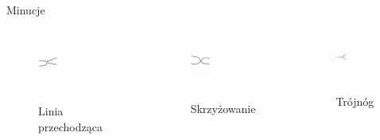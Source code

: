 \documentclass{beamer}
\begin{document}
\begin{frame}{Minucje}
    \begin{columns}
            \begin{figure}[t]
    			\centering
                \includegraphics[width=0.3\textwidth]{fingerprints/minucje/linia_przech.jpg}\\~\
                \caption*{Linia przechodząca}
            \end{figure}
		    \begin{figure}[t]
        		\centering
                \includegraphics[width=0.3\textwidth]{fingerprints/minucje/skrzyzowanie.jpg}\\~\
                \caption*{Skrzyżowanie}
            \end{figure}
        \column{0.33\textwidth}
            \begin{figure}[t]
    			\centering
                \includegraphics[width=0.3\textwidth]{fingerprints/minucje/trojnog.jpg}\\~\
                \caption*{Trójnóg}
            \end{figure}
    \end{columns}
    

\end{frame}
\end{document}
